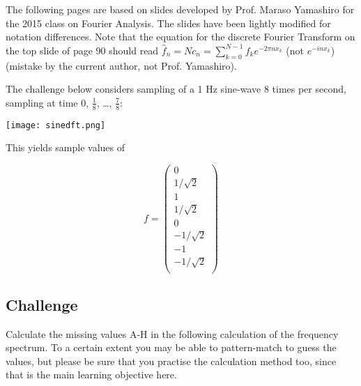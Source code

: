 The following pages are based on slides developed by Prof. Maraso Yamashiro for the 2015 class on Fourier Analysis. The slides have been lightly modified for notation differences.
Note that the equation for the discrete Fourier Transform on the top slide of page 90 should read $\hat{f}_n = N c_n = \sum_{k=0}^{N-1} f_k e^{-2 \pi n x_k}$ (not $e^{-inx_k}$) (mistake by the current author, not Prof. Yamashiro).



The challenge below considers sampling of a 1 Hz sine-wave 8 times per second, sampling at time 0, $\frac{1}{8}$, \ldots, $\frac{7}{8}$:

\texttt{[image: sinedft.png]}

This yields sample values of

\begin{equation}
f = \left(
\begin{array}{c}
 0 \\
 1/\sqrt{2} \\
 1 \\
 1/\sqrt{2} \\
 0 \\
 -1/\sqrt{2} \\
 -1 \\
 -1/\sqrt{2} \\
\end{array}
\right)
\end{equation}

\subsection*{Challenge}
Calculate the missing values A-H in the following calculation of the frequency spectrum. To a certain extent you may be able to pattern-match to guess the values, but please be sure that you practise the calculation method too, since that is the main learning objective here.


